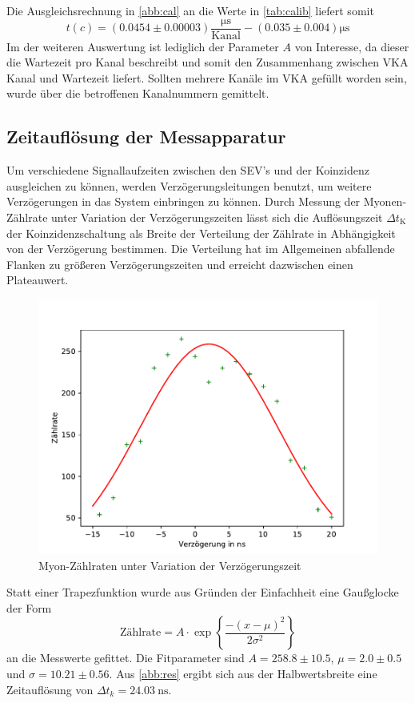 \noindent Die Ausgleichsrechnung in \autoref{abb:cal} an die Werte in \autoref{tab:calib} liefert somit
\begin{equation}
	t(c) = (0.0454 \pm 0.00003)\frac{\si{\micro\second}}{\text{Kanal}} - (0.035 \pm 0.004) \si{\micro\second}
\end{equation}
Im der weiteren Auswertung ist lediglich der Parameter $A$ von Interesse, da dieser die Wartezeit pro Kanal beschreibt und somit den Zusammenhang zwischen VKA Kanal und Wartezeit liefert. Sollten mehrere Kanäle im VKA gefüllt worden sein, wurde über die betroffenen Kanalnummern gemittelt.

\subsection{Zeitauflösung der Messapparatur}
\label{subsec:timeresolution}
Um verschiedene Signallaufzeiten zwischen den SEV's und der Koinzidenz ausgleichen zu können, werden Verzögerungsleitungen benutzt, um weitere Verzögerungen in das System einbringen zu können. Durch Messung der Myonen-Zählrate unter Variation der Verzögerungszeiten lässt sich die Auflösungszeit $\Delta t_\text{K}$ der Koinzidenzschaltung als Breite der Verteilung der Zählrate in Abhängigkeit von der Verzögerung bestimmen. Die Verteilung hat im Allgemeinen abfallende Flanken zu größeren Verzögerungszeiten und erreicht dazwischen einen Plateauwert.
\begin{figure}
	\centering
	\includegraphics[width=\textwidth]{img/res.pdf}
	\caption{Myon-Zählraten unter Variation der Verzögerungszeit}
	\label{abb:res}
\end{figure}
Statt einer Trapezfunktion wurde aus Gründen der Einfachheit eine Gaußglocke der Form
\begin{equation}
	\text{Zählrate} = A \cdot \exp\left\{\frac{-(x - \mu)^2}{2 \sigma^2}\right\}
\end{equation}
an die Messwerte gefittet. Die Fitparameter sind $A = 258.8 \pm 10.5$, $\mu = 2.0 \pm 0.5$ und $\sigma = 10.21 \pm 0.56$. Aus \autoref{abb:res} ergibt sich aus der Halbwertsbreite eine Zeitauflösung von $\Delta t_k = \SI{24.03}{\nano\second}$.

